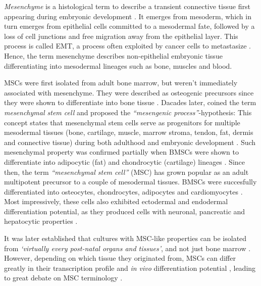 \emph{Mesenchyme} is a histological term to describe a transient connective
tissue first appearing during embryonic development
\cite{robeyMesenchymalStemCells2017}. It emerges from mesoderm, which in turn
emerges from epithelial cells committed to a mesodermal fate, followed by a loss
of cell junctions and free migration away from the epithelial layer. This
process is called \acf{EMT}, a process often exploited by cancer cells to
metastasize \cite{tamFormationMesodermalTissues1987,
    nowotschinCellularDynamicsEarly2010}. Hence, the term mesenchyme describes
non-epithelial embryonic tissue differentiating into mesodermal lineages such as
bone, muscles and blood.

\acp{MSC} were first isolated from adult bone marrow, but weren't immediately
associated with mesenchyme. They were described as osteogenic precursors since
they were shown to differentiate into bone tissue
\cite{friedensteinOsteogenesisTransplantsBone1966,
friedensteinOsteogenicPrecursorCells1971, biancoMesenchymalStemCells2014}.
Dacades later, \citet{caplanMesenchymalStemCells1991} coined the term
\emph{mesenchymal stem cell} and proposed the \emph{``mesengenic
process''}-hypothesis: This concept states that mesenchymal stem cells serve as
progenitors for multiple mesodermal tissues (bone, cartilage, muscle, marrow
stroma, tendon, fat, dermis and connective tissue) during both adulthood and
embryonic development \cite{caplanMesengenicProcess1994}. Such mesenchymal
property was confirmed partially when \acp{BMSC} were shown to differentiate
into adipocytic (fat) and chondrocytic (cartilage) lineages
\cite{pittengerMultilineagePotentialAdult1999}. Since then, the term
\emph{``mesenchymal stem cell''} (MSC) has grown popular as an adult multipotent
precursor to a couple of mesodermal tissues. \acp{BMSC} were succesfully
differentiated into osteocytes, chondrocytes, adipocytes and cardiomyocytes
\cite{gronthosSTRO1FractionAdult1994,
muruganandanAdipocyteDifferentiationBone2009, xuMesenchymalStemCells2004}. Most
impressively, these cells also exhibited ectodermal and endodermal
differentiation potential, as they produced cells with neuronal, pancreatic and
hepatocytic properties \cite{barzilayLentiviralDeliveryLMX1a2009,
wilkinsHumanBoneMarrowderived2009, gabrInsulinproducingCellsAdult2013,
stockHumanBoneMarrow2014}.

It was later established that cultures with MSC-like properties can be isolated
from \textit{`virtually every post-natal organs and tissues'}, and not just bone
marrow \cite{dasilvameirellesMesenchymalStemCells2006}. However, depending on
which tissue they originated from, \acp{MSC} can differ greatly in their
transcription profile and \textit{in vivo} differentiation potential
\cite{jansenFunctionalDifferencesMesenchymal2010,
sacchettiNoIdenticalMesenchymal2016}, leading to great debate on MSC terminology
\cite{robeyMesenchymalStemCells2017}.


